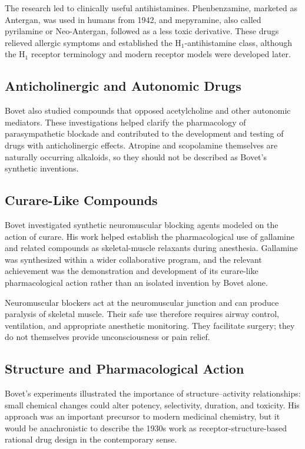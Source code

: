The research led to clinically useful antihistamines. Phenbenzamine, marketed as Antergan, was used in humans from 1942, and mepyramine, also called pyrilamine or Neo-Antergan, followed as a less toxic derivative. These drugs relieved allergic symptoms and established the H$_1$-antihistamine class, although the H$_1$ receptor terminology and modern receptor models were developed later.

\subsection{Anticholinergic and Autonomic Drugs}

Bovet also studied compounds that opposed acetylcholine and other autonomic mediators. These investigations helped clarify the pharmacology of parasympathetic blockade and contributed to the development and testing of drugs with anticholinergic effects. Atropine and scopolamine themselves are naturally occurring alkaloids, so they should not be described as Bovet's synthetic inventions.

\subsection{Curare-Like Compounds}

Bovet investigated synthetic neuromuscular blocking agents modeled on the action of curare. His work helped establish the pharmacological use of gallamine and related compounds as skeletal-muscle relaxants during anesthesia. Gallamine was synthesized within a wider collaborative program, and the relevant achievement was the demonstration and development of its curare-like pharmacological action rather than an isolated invention by Bovet alone.

Neuromuscular blockers act at the neuromuscular junction and can produce paralysis of skeletal muscle. Their safe use therefore requires airway control, ventilation, and appropriate anesthetic monitoring. They facilitate surgery; they do not themselves provide unconsciousness or pain relief.

\subsection{Structure and Pharmacological Action}

Bovet's experiments illustrated the importance of structure--activity relationships: small chemical changes could alter potency, selectivity, duration, and toxicity. His approach was an important precursor to modern medicinal chemistry, but it would be anachronistic to describe the 1930s work as receptor-structure-based rational drug design in the contemporary sense.

